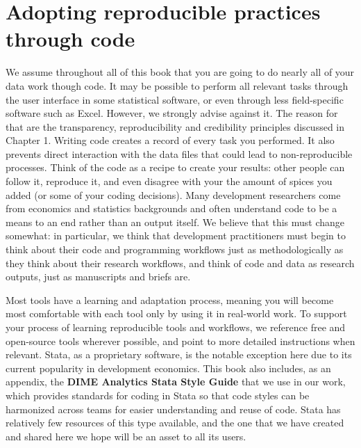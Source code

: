 \section{Adopting reproducible practices through code}

We assume throughout all of this book
that you are going to do nearly all of your data work though code.
It may be possible to perform all relevant tasks
through the user interface in some statistical software,
or even through less field-specific software such as Excel.
However, we strongly advise against it.
The reason for that are the transparency, reproducibility and credibility principles
discussed in Chapter 1.
Writing code creates a record of every task you performed.
It also prevents direct interaction
with the data files that could lead to non-reproducible processes.
Think of the code as a recipe to create your results:
other people can follow it, reproduce it,
and even disagree with your the amount of spices you added
(or some of your coding decisions).
Many development researchers come from economics and statistics backgrounds
and often understand code to be a means to an end rather than an output itself.
We believe that this must change somewhat:
in particular, we think that development practitioners
must begin to think about their code and programming workflows
just as methodologically as they think about their research workflows,
and think of code and data as research outputs, just as manuscripts and briefs are.

Most tools have a learning and adaptation process,
meaning you will become most comfortable with each tool
only by using it in real-world work.
To support your process of learning reproducible tools and workflows,
we reference free and open-source tools wherever possible,
and point to more detailed instructions when relevant.
Stata, as a proprietary software, is the notable exception here
due to its current popularity in development economics.
This book also includes, as an appendix,
the \textbf{DIME Analytics Stata Style Guide}
that we use in our work, which provides
standards for coding in Stata so that code styles
can be harmonized across teams for easier understanding and reuse of code.
Stata has relatively few resources of this type available,
and the one that we have created and shared here
we hope will be an asset to all its users.


